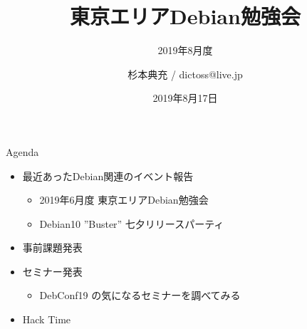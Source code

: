 \title{東京エリアDebian勉強会}
\subtitle{2019年8月度} %
\author{杉本典充 / dictoss@live.jp}
\date{2019年8月17日}



\begin{frame}
\titlepage{}
\end{frame}

\begin{frame}{Agenda}
 \begin{minipage}[t]{0.45\hsize}
  \begin{itemize}
  \item 最近あったDebian関連のイベント報告
    \begin{itemize}
    \item 2019年6月度 東京エリアDebian勉強会
    \item Debian10 ''Buster'' 七夕リリースパーティ
    \end{itemize}
  \item 事前課題発表
  \end{itemize}
 \end{minipage}
 \begin{minipage}[t]{0.45\hsize}
  \begin{itemize}
  \item セミナー発表
    \begin{itemize}
    \item DebConf19 の気になるセミナーを調べてみる
    \end{itemize}
  \item Hack Time
  \end{itemize}
 \end{minipage}
\end{frame}

